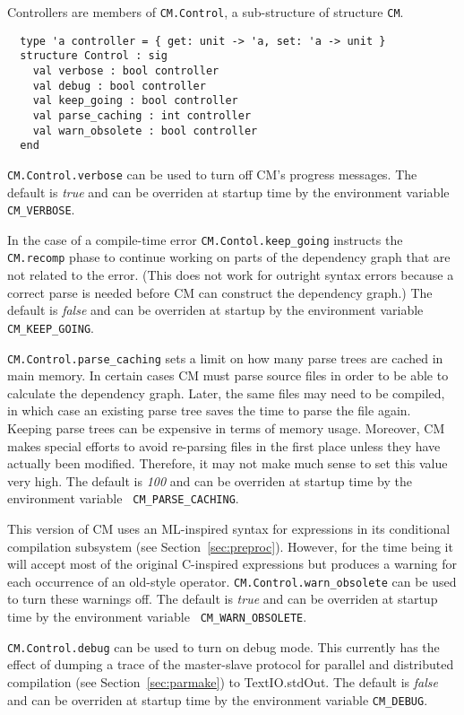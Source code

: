\documentclass{article}
\begin{document}
Controllers are members of {\tt CM.Control}, a sub-structure of
structure {\tt CM}.

\begin{verbatim}
  type 'a controller = { get: unit -> 'a, set: 'a -> unit }
  structure Control : sig
    val verbose : bool controller
    val debug : bool controller
    val keep_going : bool controller
    val parse_caching : int controller
    val warn_obsolete : bool controller
  end
\end{verbatim}

{\tt CM.Control.verbose} can be used to turn off CM's progress
messages.  The default is {\em true} and can be overriden at startup
time by the environment variable {\tt CM\_VERBOSE}.

In the case of a compile-time error {\tt CM.Contol.keep\_going}
instructs the {\tt CM.recomp} phase to continue working on parts of
the dependency graph that are not related to the error.  (This does
not work for outright syntax errors because a correct parse is needed
before CM can construct the dependency graph.)  The default is {\em
false} and can be overriden at startup by the environment variable
{\tt CM\_KEEP\_GOING}.

{\tt CM.Control.parse\_caching} sets a limit on how many parse trees
are cached in main memory.  In certain cases CM must parse source
files in order to be able to calculate the dependency graph.  Later,
the same files may need to be compiled, in which case an existing
parse tree saves the time to parse the file again.  Keeping parse
trees can be expensive in terms of memory usage.  Moreover, CM makes
special efforts to avoid re-parsing files in the first place unless
they have actually been modified.  Therefore, it may not make much
sense to set this value very high.  The default is {\em 100} and can
be overriden at startup time by the environment variable {\tt
CM\_PARSE\_CACHING}.

This version of CM uses an ML-inspired syntax for expressions in its
conditional compilation subsystem (see Section~\ref{sec:preproc}).
However, for the time being it will accept most of the original
C-inspired expressions but produces a warning for each occurrence of
an old-style operator. {\tt CM.Control.warn\_obsolete} can be used to
turn these warnings off. The default is {\em true} and can be
overriden at startup time by the environment variable {\tt
CM\_WARN\_OBSOLETE}.

{\tt CM.Control.debug} can be used to turn on debug mode.  This
currently has the effect of dumping a trace of the master-slave
protocol for parallel and distributed compilation (see
Section~\ref{sec:parmake}) to TextIO.stdOut. The default is {\em
false} and can be overriden at startup time by the environment
variable {\tt CM\_DEBUG}.
\end{document}
